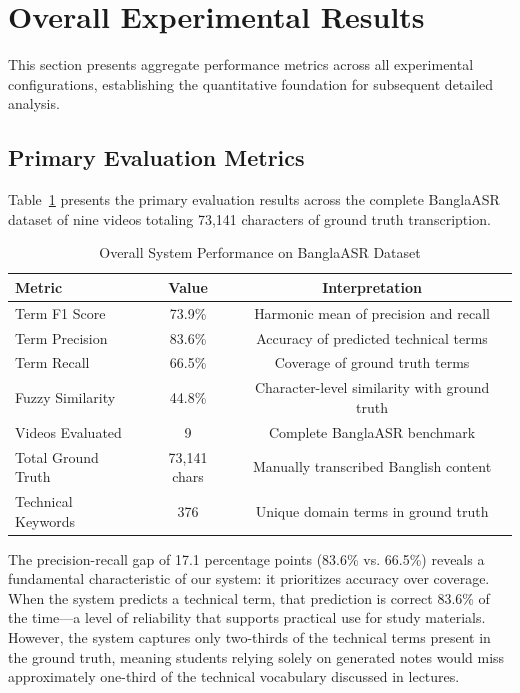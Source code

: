 \section{Overall Experimental Results}

This section presents aggregate performance metrics across all experimental configurations, establishing the quantitative foundation for subsequent detailed analysis.

\subsection{Primary Evaluation Metrics}

Table~\ref{tab:overall_results} presents the primary evaluation results across the complete BanglaASR dataset of nine videos totaling 73,141 characters of ground truth transcription.

\begin{table}[h]
\centering
\caption{Overall System Performance on BanglaASR Dataset}
\label{tab:overall_results}
\begin{tabular}{|l|c|c|}
\hline
\textbf{Metric} & \textbf{Value} & \textbf{Interpretation} \\
\hline
Term F1 Score & 73.9\% & Harmonic mean of precision and recall \\
\hline
Term Precision & 83.6\% & Accuracy of predicted technical terms \\
\hline
Term Recall & 66.5\% & Coverage of ground truth terms \\
\hline
Fuzzy Similarity & 44.8\% & Character-level similarity with ground truth \\
\hline
Videos Evaluated & 9 & Complete BanglaASR benchmark \\
\hline
Total Ground Truth & 73,141 chars & Manually transcribed Banglish content \\
\hline
Technical Keywords & 376 & Unique domain terms in ground truth \\
\hline
\end{tabular}
\end{table}

The precision-recall gap of 17.1 percentage points (83.6\% vs. 66.5\%) reveals a fundamental characteristic of our system: it prioritizes accuracy over coverage. When the system predicts a technical term, that prediction is correct 83.6\% of the time---a level of reliability that supports practical use for study materials. However, the system captures only two-thirds of the technical terms present in the ground truth, meaning students relying solely on generated notes would miss approximately one-third of the technical vocabulary discussed in lectures.

